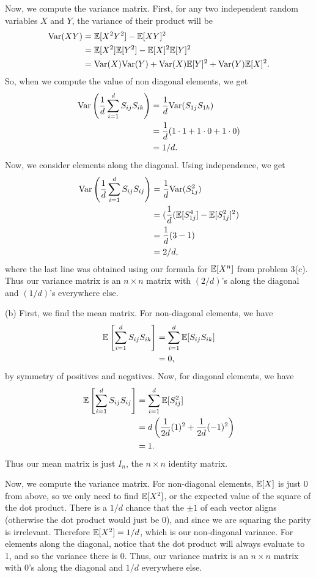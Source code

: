 Now, we compute the variance matrix. First, for any two independent random variables $X$ and $Y$, the variance of their product will be
\begin{align*}
    \text{Var}(XY) &= \mathbb{E}[X^2Y^2] - \mathbb{E}[XY]^2 \\
    &= \mathbb{E}[X^2]\mathbb{E}[Y^2] - \mathbb{E}[X]^2\mathbb{E}[Y]^2 \\
    &= \text{Var}(X)\text{Var}(Y) + \text{Var}(X)\mathbb{E}[Y]^2 + \text{Var}(Y)\mathbb{E}[X]^2.
\end{align*}
So, when we compute the value of non diagonal elements, we get
\begin{align*}
    \text{Var}\left(\frac{1}{d}\sum_{i = 1}^d S_{ij}S_{ik}\right) &= \frac{1}{d}\text{Var}(S_{1j}S_{1k}) \\
    &= \frac{1}{d}(1 \cdot 1 + 1 \cdot 0 + 1 \cdot 0) \\
    &= 1/d.
\end{align*}
Now, we consider elements along the diagonal. Using independence, we get
\begin{align*}
    \text{Var}\left(\frac{1}{d}\sum_{i = 1}^d S_{ij}S_{ij}\right) &= \frac{1}{d}\text{Var}(S_{1j}^2) \\
    &= (\frac{1}{d}(\mathbb{E}[S_{1j}^4] - \mathbb{E}[S_{1j}^2]^2) \\
    &= \frac{1}{d}(3 - 1) \\
    &= 2/d,
\end{align*}
where the last line was obtained using our formula for $\mathbb{E}[X^n]$ from problem 3(c). Thus our variance matrix is an $n \times n$ matrix with $(2/d)$'s along the diagonal and $(1/d)$'s everywhere else.

(b) First, we find the mean matrix. For non-diagonal elements, we have
\begin{align*}
    \mathbb{E}\left[\sum_{i = 1}^d S_{ij}S_{ik}\right] &= \sum_{i = 1}^d\mathbb{E}[S_{ij}S_{ik}] \\
    &= 0,
\end{align*}
by symmetry of positives and negatives. Now, for diagonal elements, we have
\begin{align*}
    \mathbb{E}\left[\sum_{i = 1}^d S_{ij}S_{ij}\right] &= \sum_{i = 1}^d\mathbb{E}[S_{ij}^2] \\
    &= d\left(\frac{1}{2d}(1)^2 + \frac{1}{2d}(-1)^2\right) \\
    &= 1.
\end{align*}
Thus our mean matrix is just $I_n$, the $n \times n$ identity matrix.

Now, we compute the variance matrix. For non-diagonal elements, $\mathbb{E}[X]$ is just 0 from above, so we only need to find $\mathbb{E}[X^2]$, or the expected value of the square of the dot product. There is a $1/d$ chance that the $\pm 1$ of each vector aligns (otherwise the dot product would just be 0), and since we are squaring the parity is irrelevant. Therefore $\mathbb{E}[X^2] = 1/d$, which is our non-diagonal variance. For elements along the diagonal, notice that the dot product will always evaluate to 1, and so the variance there is 0. Thus, our variance matrix is an $n \times n$ matrix with 0's along the diagonal and $1/d$ everywhere else.



